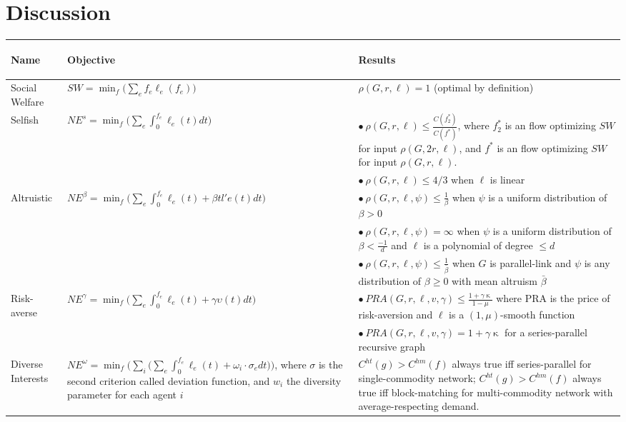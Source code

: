 \section{Discussion}\label{sec:discussion}

\begin{table}[h]
\begin{center}
    \begin{tabular}{|p{2cm}| p{6cm} | p{7cm}|} 
 \hline
        \begin{center}Name\end{center} & \begin{center}Objective\end{center} & \begin{center} Results\end{center} \\
 \hline\hline
        Social Welfare & $SW = \min_f\Big(\sum_e f_e\ell_e(f_e)\Big)$ & $\rho(G,r,\ell) = 1$ (optimal by definition) \\
 \hline
     Selfish & $NE^s = \min_f\Big(\sum_e\int_0^{f_e} \ell_e(t)dt\Big)$ & 
        $\bullet~\rho(G,r,\ell) \le \frac{C(f^*_2)}{C(f^*)}$, where $f^*_2$ is an flow optimizing $SW$ for input $\rho(G,2r,\ell)$, and $f^*$ is an flow optimizing $SW$ for input $\rho(G,r,\ell)$.\\ 
        &  & $\bullet~\rho(G,r,\ell) \le 4/3$ when $\ell$ is linear\\
 \hline
        Altruistic & $NE^\beta = \min_f\Big(\sum_e\int_0^{f_e} \ell_e(t) + \beta tl'e(t)dt\Big)$ & 
        $\bullet~\rho(G,r,\ell,\psi) \le \frac{1}{\beta}$ when $\psi$ is a uniform distribution of $\beta >0$\\
        & & $\bullet~\rho(G,r,\ell,\psi) = \infty$ when $\psi$ is a uniform distribution of $\beta < \frac{-1}{d}$ and $\ell$ is a polynomial of degree $\le d$\\
        & & $\bullet~\rho(G,r,\ell,\psi) \le \frac{1}{\bar{\beta}}$ when $G$ is parallel-link and $\psi$ is any distribution of $\beta \ge 0$ with mean altruism $\bar{\beta}$\\
\hline
     Risk-averse & $NE^\gamma = \min_f\Big(\sum_e\int_0^{f_e} \ell_e(t) + \gamma\upsilon(t)dt\Big)$ & 
    $\bullet~PRA(G,r,\ell,v,\gamma) \leq \frac{1 + \gamma\upkappa}{1 - \mu}$ where PRA is the price of risk-aversion and $\ell$ is a $(1,\mu)$-smooth function\\
    & & $\bullet~PRA(G,r,\ell,v,\gamma) = 1 + \gamma\upkappa $ for a series-parallel recursive graph\\
\hline
     Diverse Interests & $NE^\omega = \min_f\Big(\sum_i \big(\sum_e\int_0^{f_e} \ell_e(t) + \omega_i\cdot \sigma_e dt\big)\Big)$, where $\sigma$ is the second criterion called deviation function, and $w_i$ the diversity parameter for each agent $i$ & $C^{ht}(g)> C^{hm}(f)$ always true iff series-parallel for single-commodity network; $C^{ht}(g)> C^{hm}(f)$ always true iff block-matching for multi-commodity network with average-respecting demand.\\

\end{tabular}
\end{center}
\end{table}
